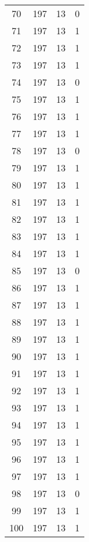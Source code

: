 \begin{longtable}[!]{c|ccc}
	70	& 197	& 13	& 0	\\
	71	& 197	& 13	& 1	\\
	72	& 197	& 13	& 1	\\
	73	& 197	& 13	& 1	\\
	74	& 197	& 13	& 0	\\
	75	& 197	& 13	& 1	\\
	76	& 197	& 13	& 1	\\
	77	& 197	& 13	& 1	\\
	78	& 197	& 13	& 0	\\
	79	& 197	& 13	& 1	\\
	80	& 197	& 13	& 1	\\
	81	& 197	& 13	& 1	\\
	82	& 197	& 13	& 1	\\
	83	& 197	& 13	& 1	\\
	84	& 197	& 13	& 1	\\
	85	& 197	& 13	& 0	\\
	86	& 197	& 13	& 1	\\
	87	& 197	& 13	& 1	\\
	88	& 197	& 13	& 1	\\
	89	& 197	& 13	& 1	\\
	90	& 197	& 13	& 1	\\
	91	& 197	& 13	& 1	\\
	92	& 197	& 13	& 1	\\
	93	& 197	& 13	& 1	\\
	94	& 197	& 13	& 1	\\
	95	& 197	& 13	& 1	\\
	96	& 197	& 13	& 1	\\
	97	& 197	& 13	& 1	\\
	98	& 197	& 13	& 0	\\
	99	& 197	& 13	& 1	\\
	100	& 197	& 13	& 1	\\
\end{longtable}


